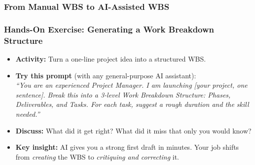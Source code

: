 \begin{frame}[fragile]\frametitle{From Manual WBS to AI-Assisted WBS}

\begin{center}
\end{center}

\end{frame}

\begin{frame}[fragile]\frametitle{Hands-On Exercise: Generating a Work Breakdown Structure}

\begin{itemize}
  \item \textbf{Activity:} Turn a one-line project idea into a structured WBS.
  \item \textbf{Try this prompt} (with any general-purpose AI assistant):\\
    \textit{``You are an experienced Project Manager. I am launching [your project, one sentence]. Break this into a 3-level Work Breakdown Structure: Phases, Deliverables, and Tasks. For each task, suggest a rough duration and the skill needed.''}
  \item \textbf{Discuss:} What did it get right? What did it miss that only you would know?
  \item \textbf{Key insight:} AI gives you a strong first draft in minutes. Your job shifts from \textit{creating} the WBS to \textit{critiquing and correcting} it.
\end{itemize}

\end{frame}

